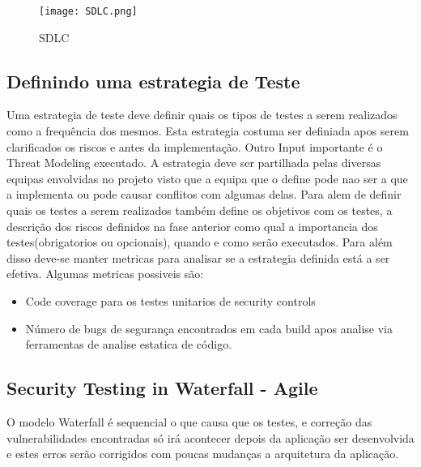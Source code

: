 \begin{figure}[h!]
\centering
\texttt{[image: SDLC.png]}
\label{fig:sdlc}
\caption{SDLC}
\end{figure}


\subsection{Definindo uma estrategia de Teste}

	Uma estrategia de teste deve definir quais os tipos de testes a serem realizados como a frequência dos mesmos. Esta estrategia costuma ser definiada apos serem clarificados os riscos e antes da implementação. Outro Input importante é o Threat Modeling executado.
	A estrategia deve ser partilhada pelas diversas equipas envolvidas no projeto visto que a equipa que o define pode nao ser a que a implementa ou pode causar conflitos com algumas delas.
	Para alem de definir quais os testes a serem realizados também define os objetivos com os testes, a descrição dos riscos definidos na fase anterior como qual a importancia dos testes(obrigatorios ou opcionais), quando e como serão executados.
	Para além disso deve-se manter metricas para analisar se a estrategia definida está a ser efetiva. Algumas metricas possiveis são:

\begin{itemize}

	\item Code coverage para os testes unitarios de security controls
	\item Número de bugs de segurança encontrados em cada build apos analise via ferramentas de analise estatica de código.
	
\end{itemize}


\subsection{Security Testing in Waterfall - Agile}

	O modelo Waterfall é sequencial o que causa que os testes, e correção das vulnerabilidades encontradas só irá acontecer depois da aplicação ser desenvolvida e estes erros serão corrigidos com poucas mudanças a arquitetura da aplicação.

